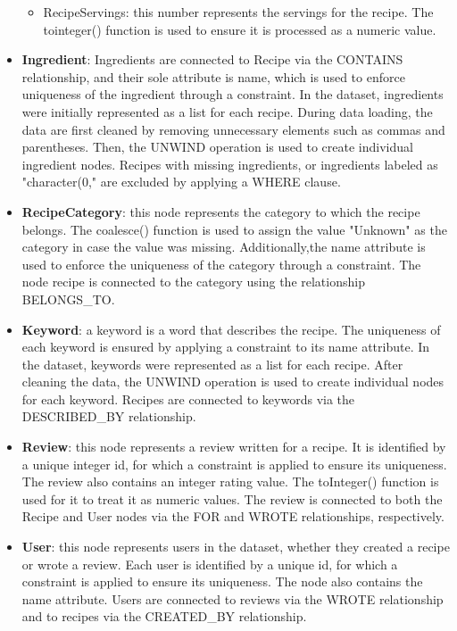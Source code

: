 \begin{itemize}
\begin{itemize}
              \item RecipeServings: this number represents the servings for the recipe. The tointeger() function is used to ensure it is processed as a numeric value.
          \end{itemize}
    \item \textbf{Ingredient}: Ingredients are connected to Recipe via the CONTAINS relationship, and their sole attribute is name, which is used to enforce uniqueness of the ingredient through a constraint. In the dataset, ingredients were initially represented as a list for each recipe. During data loading, the data are first cleaned by removing unnecessary elements such as commas and parentheses. Then, the UNWIND operation is used to create individual ingredient nodes. Recipes with missing ingredients, or ingredients labeled as "character(0," are excluded by applying a WHERE clause.
    \item \textbf{RecipeCategory}: this node represents the category to which the recipe belongs. The coalesce() function is used to assign the value "Unknown" as the category in case the value was missing. Additionally,the name attribute is used to enforce the uniqueness of the category through a constraint. The node recipe is connected to the category using the relationship BELONGS\_TO.
    \item \textbf{Keyword}: a keyword is a word that describes the recipe. The uniqueness of each keyword is ensured by applying a constraint to its name attribute. In the dataset, keywords were represented as a list for each recipe. After cleaning the data, the UNWIND operation is used to create individual nodes for each keyword. Recipes are connected to keywords via the DESCRIBED\_BY relationship.
    \item \textbf{Review}: this node represents a review written for a recipe. It is identified by a unique integer id, for which a constraint is applied to ensure its uniqueness. The review also contains an integer rating value. The toInteger() function is used for it to treat it as numeric values. The review is connected to both the Recipe and User nodes via the FOR and WROTE relationships, respectively.
    \item \textbf{User}: this node represents users in the dataset, whether they created a recipe or wrote a review. Each user is identified by a unique id, for which a constraint is applied to ensure its uniqueness. The node also contains the name attribute. Users are connected to reviews via the WROTE relationship and to recipes via the CREATED\_BY relationship.
\end{itemize}
